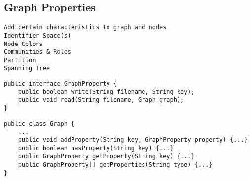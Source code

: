\subsection{Graph Properties}
\label{sec:graph:properties}


\begin{verbatim}
Add certain characteristics to graph and nodes
Identifier Space(s)
Node Colors
Communities & Roles
Partition
Spanning Tree
\end{verbatim}


\begin{lstlisting}[label={lst:graph-properties:interface},caption={GraphProperty interface}]
public interface GraphProperty {
	public boolean write(String filename, String key);
	public void read(String filename, Graph graph);
}
\end{lstlisting}



\begin{lstlisting}[label={lst:graph-properties:graph},caption={Graph methods for handling graph properties}]
public class Graph {
	...
	public void addProperty(String key, GraphProperty property) {...}
	public boolean hasProperty(String key) {...}
	public GraphProperty getProperty(String key) {...}
	public GraphProperty[] getProperties(String type) {...}
}
\end{lstlisting}